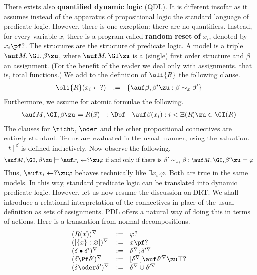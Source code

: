 There exists also {\bf quantified dynamic logic} ({\sf QDL}). It
is different insofar as it assumes instead of the apparatus of
propositional logic the standard language of predicate logic.
However, there is one exception: there are no quantifiers. Instead,
for every variable $x_i$ there
is a program called {\bf random reset of} $x_i$, denoted by
$x_i \pf ?$. The structures are the structure of predicate logic.
A model is a triple $\auf M, \GI, \beta\zu$, where
$\auf M, \GI\zu$ is a (single) first order structure and $\beta$ an
assignment. (For the benefit of the reader we deal only with
assignments, that is, total functions.) We add to the definition
of $\oli{R}$ the following clause.
$$\begin{array}{l@{\quad := \quad}l}
\oli{R}(x_i \leftarrow ?) & \{\auf \beta, \beta'\zu : \beta \sim_x
    \beta'\}
\end{array}$$
Furthermore, we assume for atomic formulae the following.
$$\begin{array}{l@{\quad :\Dpf \quad}l}
\auf M, \GI, \beta\zu \models R(\vec{x}) &
    \auf \beta(x_i) : i < \Xi(R)\zu \in \GI(R) \\
\end{array}$$
The clauses for $\nicht$, $\oder$ and the other propositional
connectives are entirely standard. Terms are evaluated in the
usual manner, using the valuation: $[t]^{\beta}$ is defined
inductively. Now observe the following.
$$\auf M, \GI, \beta\zu \models \auf x_i\leftarrow ?\zu \varphi
    \mbox{ if and only if there is }\beta' \sim_{x_i} \beta:
    \auf M, \GI, \beta'\zu \models \varphi$$
Thus, $\auf x_i\leftarrow ?\zu \varphi$ behaves technically like
$\exists x_i.\varphi$. Both are true in the same models. In this
way, standard predicate logic can be translated into dynamic
predicate logic. However, let us now resume the discussion on DRT.
We shall introduce a relational interpretation of the connectives
in place of the usual definition as sets of assignments. {\sf PDL}
offers a natural way of doing this in terms of actions. Here is a
translation from normal decompositions.
$$\begin{array}{l@{\quad := \quad}l}
(R(\vec{x}))^{\nabla} & \varphi? \\
([\{x\} : \varnothing])^{\nabla} & x \pf ?\\
(\delta \bullet \delta')^{\nabla} & \delta^{\nabla};\delta'^{\nabla} \\
(\delta \Pf \delta')^{\nabla} & [\delta^{\nabla}]%
    \auf \delta'^{\nabla} \zu\top? \\
(\delta \oder \delta')^{\nabla} & \delta^{\nabla} \cup \delta'^{\nabla}
\end{array}$$
